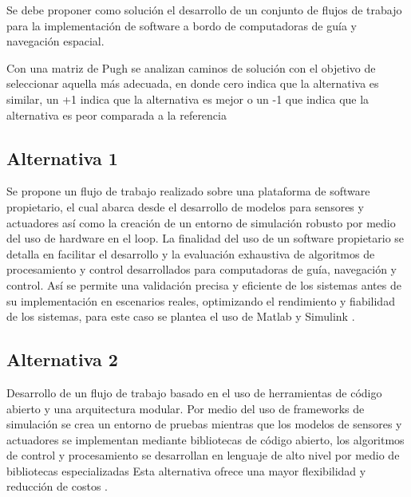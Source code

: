 \documentclass[12pt]{article}
\begin{document}
Se debe proponer como solución el desarrollo de un conjunto de flujos de trabajo para la implementación de software a bordo de computadoras de guía y navegación espacial.

Con una matriz de Pugh se analizan caminos de solución con el objetivo de seleccionar aquella más adecuada, en donde cero indica que la alternativa es similar, un +1 indica que la alternativa es mejor o un -1 que indica que la alternativa es peor comparada a la referencia

\newpage

\subsection{Alternativa 1}

Se propone un flujo de trabajo realizado sobre una plataforma de software propietario, el cual abarca desde el desarrollo de modelos para sensores y actuadores así como la creación de un entorno de simulación robusto por medio del uso de hardware en el loop. La finalidad del uso de un software propietario se detalla en facilitar el desarrollo y la evaluación exhaustiva de algoritmos de procesamiento y control desarrollados para computadoras de guía, navegación y control. Así se permite una validación precisa y eficiente de los sistemas antes de su implementación en escenarios reales, optimizando el rendimiento y fiabilidad de los sistemas, para este caso se plantea el uso de Matlab y Simulink \cite{MathWorks2024} \cite{montoya2020advanced}.

\subsection{Alternativa 2}

Desarrollo de un flujo de trabajo basado en el uso de herramientas de código abierto y una arquitectura modular. Por medio del uso de frameworks de simulación se crea un entorno de pruebas mientras que los modelos de sensores y actuadores se implementan mediante bibliotecas de código abierto, los algoritmos de control y procesamiento se desarrollan en lenguaje de alto nivel por medio de bibliotecas especializadas Esta alternativa ofrece una mayor flexibilidad y reducción de costos \cite{Furfaro1997}.
\end{document}
